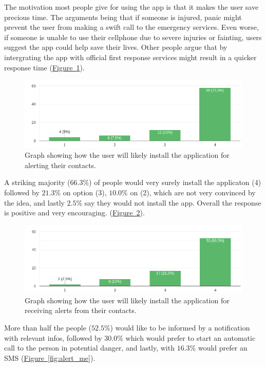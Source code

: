 \documentclass[12pt]{article}
\begin{document}
The motivation most people give for using the app is that it makes the user save precious time.
The arguments being that if someone is injured, panic might prevent the user from making a swift
call to the emergency services.
Even worse, if someone is unable to use their cellphone due to severe injuries or fainting, users suggest
the app could help save their lives.
Other people argue that by intergrating the app with official first response services might result in
a quicker response time (\hyperref[fig:install_for_me]{Figure~\ref*{fig:install_for_me}}).

\begin{figure}[ht]
    \centering
    \includegraphics[width=.7\textwidth]{Images/install_for_me.png}
    \caption{Graph showing how the user will likely install the application
    for alerting their contacts.}
    \label{fig:install_for_me}
\end{figure}

A striking majority ($66.3\%$) of people would very surely install the applicaton (4)
followed by $21.3\%$ on option (3), $10.0\%$ on (2), which are not very convinced by the idea,
and lastly $2.5\%$ say they would not install the app.
Overall the response is positive and very encouraging.
(\hyperref[fig:install_for_others]{Figure~\ref*{fig:install_for_others}}).

\begin{figure}[ht]
    \centering
    \includegraphics[width=.7\textwidth]{Images/install_for_others.png}
    \caption{Graph showing how the user will likely install the application
    for receiving alerts from their contacts.}
    \label{fig:install_for_others}
\end{figure}

More than half the people ($52.5\%$) would like to be informed by a notification
with relevant infos, followed by $30.0\%$ which would prefer to start an automatic
call to the person in potential danger, and lastly, with $16.3\%$ would prefer an SMS 
(\hyperref[fig:alert_me]{Figure~\ref*{fig:alert_me}}).
\end{document}
